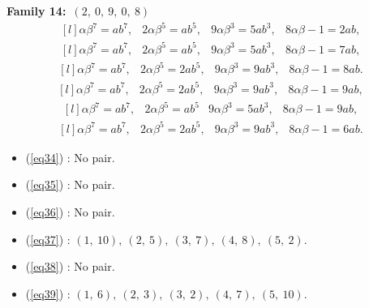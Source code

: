 \documentclass[12pt,a4wide, reqno]{amsart}
\theoremstyle{definition}
\theoremstyle{remark}
\numberwithin{equation}{section}
\begin{document}
    \textbf{Family 14:}~$(2,~0,~9,~0,~8)$ 
\begin{equation}\label{eq34}
    \begin{matrix*}[l]
         \alpha \beta ^7=ab^7, & 2\alpha \beta ^5=ab^5, & 9\alpha \beta ^3=5ab ^3, & 8\alpha\beta-1=2ab,
    \end{matrix*}
\end{equation}
\begin{equation}\label{eq35}
    \begin{matrix*}[l]
          \alpha \beta ^7=ab^7, & 2\alpha \beta ^5=ab^5, & 9\alpha \beta ^3=5ab ^3, & 8\alpha\beta-1=7ab,
    \end{matrix*}
\end{equation}
\begin{equation}\label{eq36}
    \begin{matrix*}[l]
          \alpha \beta ^7=ab^7, & 2\alpha \beta ^5=2ab^5, & 9\alpha \beta ^3=9ab ^3, & 8\alpha\beta-1=8ab.
    \end{matrix*}
\end{equation}
\begin{equation}\label{eq37}
    \begin{matrix*}[l]
          \alpha \beta ^7=ab^7, & 2\alpha \beta ^5=2ab^5, & 9\alpha \beta ^3=9ab^3, & 8\alpha\beta-1=9ab,
    \end{matrix*}
\end{equation}
\begin{equation}\label{eq38}
    \begin{matrix*}[l]
          \alpha \beta ^7=ab^7, & 2\alpha \beta ^5=ab^5 & 9\alpha \beta ^3=5ab ^3, & 8\alpha\beta-1=9ab,
    \end{matrix*}
\end{equation}
\begin{equation}\label{eq39}
    \begin{matrix*}[l]
          \alpha \beta ^7=ab^7, & 2\alpha \beta ^5=2ab^5, & 9\alpha \beta ^3=9ab ^3, & 8\alpha\beta-1=6ab.
    \end{matrix*}
\end{equation}

\begin{itemize}
    \item 
    (\ref{eq34}) : No pair.
    \item 
    (\ref{eq35}) : No pair.
    \item 
    (\ref{eq36}) : No pair.
    \item 
    (\ref{eq37}) : $(1,~10),~(2,~5),~(3,~7),~(4,~8),~(5,~2).$
    \item 
    (\ref{eq38}) : No pair.
    \item
    (\ref{eq39}) : $(1,~6),~(2,~3),~(3,~2),~(4,~7),~(5,~10).$
    \end{itemize}
\end{document}
